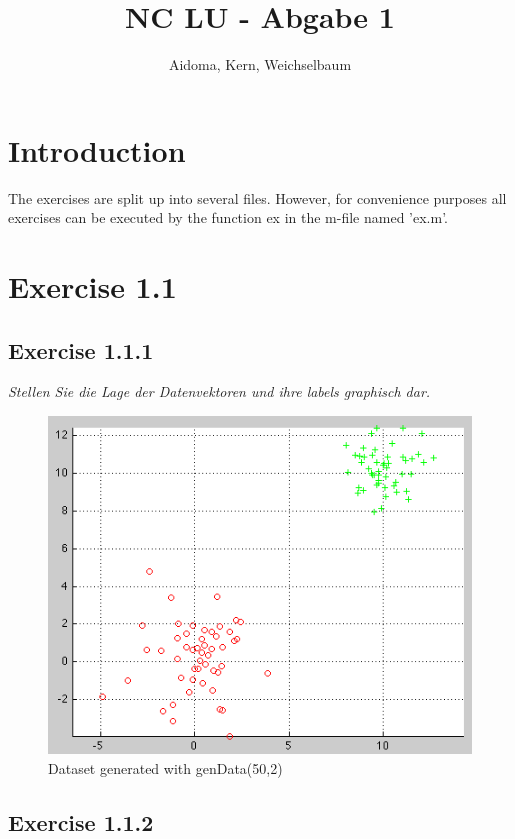 \documentclass[12pt]{article}
\title{NC LU - Abgabe 1}
\author{Aidoma, Kern, Weichselbaum}
\begin{document}
	
\maketitle	
	

\section{Introduction}

The exercises are split up into several files. However, for convenience purposes all exercises can be executed by the function ex in the m-file named 'ex.m'.

\section{Exercise 1.1}
\subsection{Exercise 1.1.1}
\textit{Stellen Sie die Lage der Datenvektoren und ihre labels graphisch dar.}

\begin{figure}[htp]
	\centering
	\includegraphics[width=1\textwidth]{ab1_1_1.png}
	\caption{Dataset generated with genData(50,2)}
	\label{fig:vector}
\end{figure}

\subsection{Exercise 1.1.2}
\end{document}
